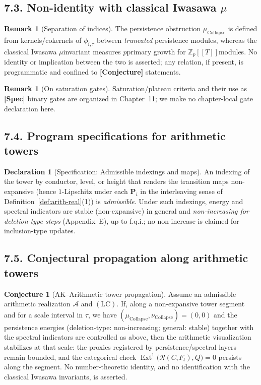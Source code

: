 \documentclass[11pt]{article}
\numberwithin{equation}{section}
\theoremstyle{plain}
\theoremstyle{definition}
\theoremstyle{remark}
\DeclareMathOperator{\Ext}{Ext}
\DeclareRobustCommand{\hyp}{\nobreakdash-}
\newcommand{\Rfun}{\mathcal{R}}
\theoremstyle{plain}
\theoremstyle{definition}
\numberwithin{equation}{section}
\newtheorem{conjecture}{Conjecture}[section]
\theoremstyle{definition}
\newtheorem{remark}[theorem]{Remark}
\newtheorem{declaration}[theorem]{Declaration}
\DeclareRobustCommand{\muc}{\mu_{\mathrm{Collapse}}}
\DeclareRobustCommand{\nuc}{\nu_{\mathrm{Collapse}}}
\DeclareRobustCommand{\LC}{\texorpdfstring{\ensuremath{\mathrm{(LC)}}}{(LC)}}
\numberwithin{equation}{section}
\theoremstyle{plain}
\theoremstyle{definition}
\theoremstyle{remark}
\providecommand{\muc}{\mu_{\mathrm{Collapse}}}
\providecommand{\nuc}{\nu_{\mathrm{Collapse}}}
\begin{document}
\subsection*{7.3. Non\hyp identity with classical Iwasawa \(\mu\)}
\begin{remark}[Separation of indices]\label{rk:separation}
The persistence obstruction \(\muc\) is defined from kernels/cokernels of \(\phi_{i,\tau}\) between \emph{truncated} persistence modules, whereas the classical Iwasawa \(\mu\)\nobreakdash invariant measures \(p\)\nobreakdash primary growth for \(\mathbb{Z}_p[[T]]\)\nobreakdash modules.
No identity or implication between the two is asserted; any relation, if present, is programmatic and confined to \textbf{[Conjecture]} statements.
\end{remark}

\begin{remark}[On saturation gates]
Saturation/plateau criteria and their use as \textbf{[Spec]} binary gates are organized in Chapter~11; we make no chapter\hyp local gate declaration here.
\end{remark}

\subsection*{7.4. Program specifications for arithmetic towers}
\begin{declaration}[Specification: Admissible indexings and maps]\label{spec:indexing}
An indexing of the tower by conductor, level, or height that renders the transition maps non\hyp expansive (hence \(1\)\hyp Lipschitz under each \(\mathbf{P}_i\) in the interleaving sense of Definition~\ref{def:arith-real}(1)) is \emph{admissible}.
Under such indexings, energy and spectral indicators are stable (non\hyp expansive) in general and \emph{non\hyp increasing for deletion\hyp type steps} (Appendix~E), up to f.q.i.; no non\hyp increase is claimed for inclusion\hyp type updates.
\end{declaration}

\subsection*{7.5. Conjectural propagation along arithmetic towers}
\begin{conjecture}[AK–Arithmetic tower propagation]\label{conj:arith-prop}
Assume an admissible arithmetic realization $\mathcal{A}$ and \LC.
If, along a non\hyp expansive tower segment and for a scale interval in $\tau$, we have $(\muc,\nuc)=(0,0)$ and the persistence energies (deletion\hyp type: non\hyp increasing; general: stable) together with the spectral indicators are controlled as above, then the arithmetic visualization stabilizes at that scale:
the proxies registered by persistence/spectral layers remain bounded, and the categorical check
\(\Ext^1\big(\Rfun(C_\tau F_t),Q\big)=0\) persists along the segment.
No number\hyp theoretic identity, and no identification with the classical Iwasawa invariants, is asserted.
\end{conjecture}
\end{document}
